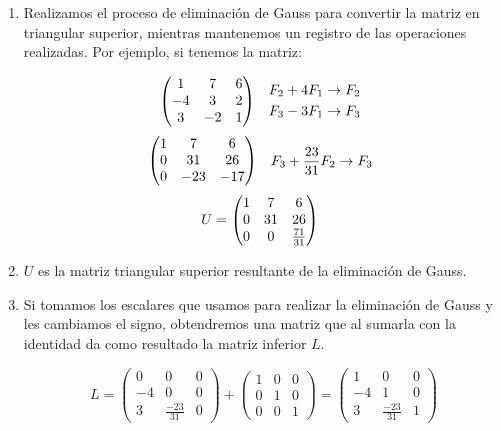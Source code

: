 \documentclass[letterpaper,12pt]{article}
\begin{document}
\begin{enumerate}
    \item Realizamos el proceso de eliminación de Gauss para convertir la matriz en triangular superior, mientras mantenemos un registro de las operaciones realizadas. Por ejemplo, si tenemos la matriz:
    
    \[
    \begin{array}{@{}cl}
    \begin{pmatrix}
    1 & 7 & 6 \\
    -4 & 3 & 2 \\
    3 & -2 & 1
    \end{pmatrix}
    &
    \begin{aligned}
        F_2 + 4F_1 \rightarrow F_2 \\
        F_3 - 3F_1 \rightarrow F_3
    \end{aligned}

    \end{array}
\]
   \[
    \begin{array}{@{}cl}
    \begin{pmatrix}
    1 & 7 & 6 \\
    0 & 31 & 26 \\
    0 & -23 & -17
    \end{pmatrix}
    &
    \begin{aligned}
        F_3 + \frac{23}{31}F_2 \rightarrow F_3
    \end{aligned}

    \end{array}
\]
\[ U =
    \begin{array}{@{}cl}
    \begin{pmatrix}
    1 & 7 & 6 \\
    0 & 31 & 26 \\
    0 & 0 & \frac{71}{31}
    \end{pmatrix}
    \end{array}
    \]
    
    \item \(U\) es la matriz triangular superior resultante de la eliminación de Gauss.

    \item Si tomamos los escalares que usamos para realizar la eliminación de Gauss y les cambiamos el signo, obtendremos una matriz que al sumarla con la identidad da como resultado la matriz inferior \(L\).

\[
L = \begin{pmatrix}
    0 & 0 & 0 \\
    -4 & 0 & 0 \\
    3 & \frac{-23}{31} & 0
    \end{pmatrix}
    + 
    \begin{pmatrix}
    1 & 0 & 0 \\
    0 & 1 & 0 \\
    0 & 0 & 1
    \end{pmatrix}
    =
    \begin{pmatrix}
    1 & 0 & 0 \\
    -4 & 1 & 0 \\
    3 & \frac{-23}{31} & 1
    \end{pmatrix}
\]


\end{enumerate}
\end{document}
